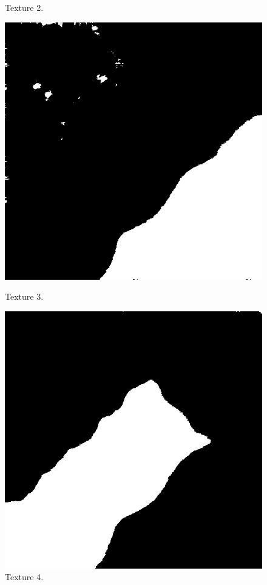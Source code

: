 \documentclass[12pt,a4paper,notitlepage,oneside,amsmath,amssymb]{article}
\begin{document}
\begin{CJK*}{UTF8}{bkai}
\begin{enumerate}[label=(\alph*)]
\begin{enumerate}
\begin{figure}[hbt!]
\begin{minipage}{.25\textwidth}
			\caption*{Texture 2.}
		\end{minipage}%
		\begin{minipage}{.25\textwidth}
			\centering
			\includegraphics[width=.9\linewidth]{sample2_texture3_0}
			\caption*{Texture 3.}
		\end{minipage}%
		\begin{minipage}{.25\textwidth}
			\centering
			\includegraphics[width=.9\linewidth]{sample2_texture4_0}
			\caption*{Texture 4.}
		\end{minipage}
	\end{figure}


\end{enumerate}
\end{enumerate}
\end{CJK*}
\end{document}
